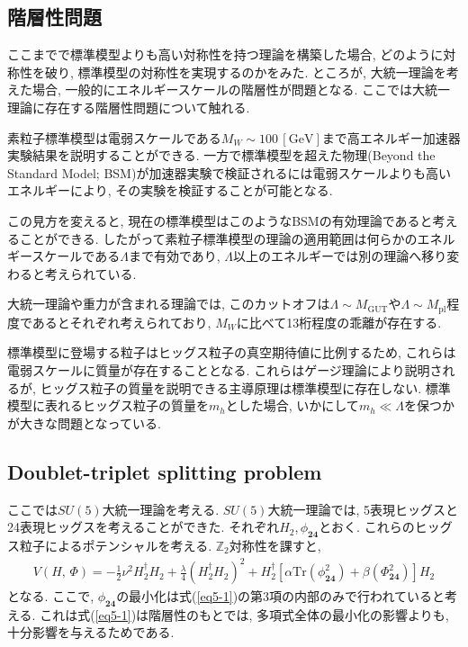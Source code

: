 \subsection{階層性問題}
ここまでで標準模型よりも高い対称性を持つ理論を構築した場合, どのように対称性を破り, 標準模型の対称性を実現するのかをみた.
ところが, 大統一理論を考えた場合, 一般的にエネルギースケールの階層性が問題となる.
ここでは大統一理論に存在する階層性問題について触れる.

素粒子標準模型は電弱スケールである$M_W\sim100\,[\mathrm{GeV}]$まで高エネルギー加速器実験結果を説明することができる.
一方で標準模型を超えた物理(Beyond the Standard Model; BSM)が加速器実験で検証されるには電弱スケールよりも高いエネルギーにより, その実験を検証することが可能となる.

この見方を変えると, 現在の標準模型はこのようなBSMの有効理論であると考えることができる.
したがって素粒子標準模型の理論の適用範囲は何らかのエネルギースケールである$\Lambda$まで有効であり, $\Lambda$以上のエネルギーでは別の理論へ移り変わると考えられている.

大統一理論や重力が含まれる理論では, このカットオフは$\Lambda\sim M_{\mathrm{GUT}}$や$\Lambda\sim M_{\mathrm{pl}}$程度であるとそれぞれ考えられており, $M_W$に比べて13桁程度の乖離が存在する.

標準模型に登場する粒子はヒッグス粒子の真空期待値に比例するため, これらは電弱スケールに質量が存在することとなる.
これらはゲージ理論により説明されるが, ヒッグス粒子の質量を説明できる主導原理は標準模型に存在しない.
標準模型に表れるヒッグス粒子の質量を$m_h$とした場合, いかにして$m_h \ll \Lambda$を保つかが大きな問題となっている.

\subsection{Doublet-triplet splitting problem}
ここでは$SU(5)$大統一理論を考える.
$SU(5)$大統一理論では, 5表現ヒッグスと24表現ヒッグスを考えることができた.
それぞれ$H_2$,\,$\phi_{\bm{24}}$とおく.
これらのヒッグス粒子によるポテンシャルを考える.
$\mathbb{Z}_2$対称性を課すと,
\begin{align}
  V(H,\,\Phi) = -\frac{1}{2}\nu^2 H_2^\dagger H_2 + \frac{\lambda}{4}(H_2^\dagger H_2)^2 + H_2^\dagger[\alpha \mathrm{Tr}(\phi_{\bm{24}}^2)+\beta(\Phi_{\bm{24}}^2)]H_2 \label{eq5-1} 
\end{align}
となる.
ここで, $\phi_{\bm{24}}$の最小化は式(\ref{eq5-1})の第3項の内部のみで行われていると考える.
これは式(\ref{eq5-1})は階層性のもとでは, 多項式全体の最小化の影響よりも, 十分影響を与えるためである.


